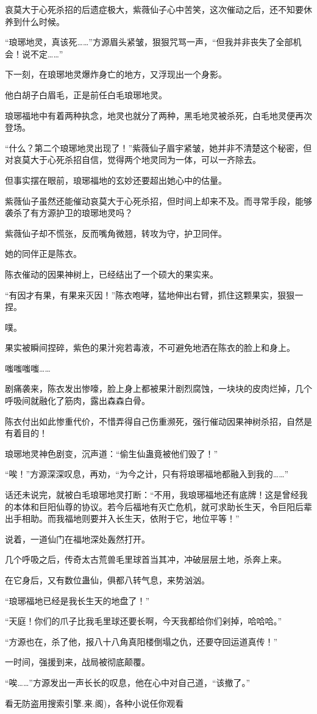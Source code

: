 \begin{this_body}
哀莫大于心死杀招的后遗症极大，紫薇仙子心中苦笑，这次催动之后，还不知要休养到什么时候。

“琅琊地灵，真该死……”方源眉头紧皱，狠狠咒骂一声，“但我并非丧失了全部机会！说不定……”

下一刻，在琅琊地灵爆炸身亡的地方，又浮现出一个身影。

他白胡子白眉毛，正是前任白毛琅琊地灵。

琅琊福地中有着两种执念，地灵也就分了两种，黑毛地灵被杀死，白毛地灵便再次登场。

“什么？第二个琅琊地灵出现了！”紫薇仙子眉宇紧皱，她并非不清楚这个秘密，但对哀莫大于心死杀招自信，觉得两个地灵同为一体，可以一齐除去。

但事实摆在眼前，琅琊福地的玄妙还要超出她心中的估量。

紫薇仙子虽然还能催动哀莫大于心死杀招，但时间上却来不及。而寻常手段，能够袭杀了有方源护卫的琅琊地灵吗？

紫薇仙子却不慌张，反而嘴角微翘，转攻为守，护卫同伴。

她的同伴正是陈衣。

陈衣催动的因果神树上，已经结出了一个硕大的果实来。

“有因才有果，有果来灭因！”陈衣咆哮，猛地伸出右臂，抓住这颗果实，狠狠一捏。

噗。

果实被瞬间捏碎，紫色的果汁宛若毒液，不可避免地洒在陈衣的脸上和身上。

嗤嗤嗤嗤……

剧痛袭来，陈衣发出惨嚎，脸上身上都被果汁剧烈腐蚀，一块块的皮肉烂掉，几个呼吸间就融化了筋肉，露出森森白骨。

陈衣付出如此惨重代价，不惜弄得自己伤重濒死，强行催动因果神树杀招，自然是有着目的！

琅琊地灵神色剧变，沉声道：“偷生仙蛊竟被他们毁了！”

“唉！”方源深深叹息，再劝，“为今之计，只有将琅琊福地都融入到我的……”

话还未说完，就被白毛琅琊地灵打断：“不用，我琅琊福地还有底牌！这是曾经我的本体和巨阳仙尊的协议。若今后福地有灭亡危机，就可求助长生天，令巨阳后辈出手相助。而我福地则要并入长生天，依附于它，地位平等！”

说着，一道仙门在福地深处轰然打开。

几个呼吸之后，传奇太古荒兽毛里球首当其冲，冲破层层土地，杀奔上来。

在它身后，又有数位蛊仙，俱都八转气息，来势汹汹。

“琅琊福地已经是我长生天的地盘了！”

“天庭！你们的爪子比我毛里球还要长啊，今天我都给你们剁掉，哈哈哈。”

“方源也在，杀了他，报八十八角真阳楼倒塌之仇，还要夺回运道真传！”

一时间，强援到来，战局被彻底颠覆。

“唉……”方源发出一声长长的叹息，他在心中对自己道，“该撤了。”

看无防盗用搜索引擎.来.阁)，各种小说任你观看

\end{this_body}

